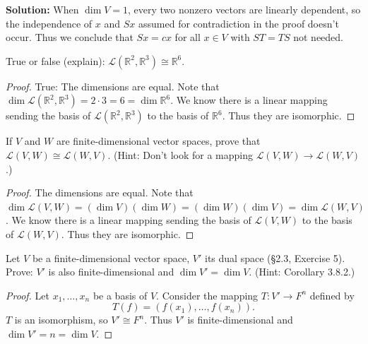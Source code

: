 \textbf{Solution: } When $\dim V = 1$, every two nonzero vectors are linearly dependent, 
so the independence of $x$ and $Sx$ assumed for contradiction in the proof doesn't occur.
Thus we conclude that $Sx = cx$ for all $x \in V$ with $ST = TS$ not needed.

\begin{tcolorbox}[title=Exercise 2, breakable]
    True or false (explain): $\mathcal{L}(\mathbb{R}^2, \mathbb{R}^3) \cong \mathbb{R}^6$.
\end{tcolorbox}

\begin{proof}
    True:
    The dimensions are equal.
    Note that $\dim \mathcal{L}(\mathbb{R}^2, \mathbb{R}^3) = 2 \cdot 3 = 6 = \dim \mathbb{R}^6$.
    We know there is a linear mapping sending the basis of 
        $\mathcal{L}(\mathbb{R}^2, \mathbb{R}^3)$ to the basis 
        of $\mathbb{R}^6$.
    Thus they are isomorphic.
\end{proof}

\begin{tcolorbox}[title=Exercise 3, breakable]
    If $V$ and $W$ are finite-dimensional vector spaces, prove that 
    $\mathcal{L}(V, W) \cong \mathcal{L}(W, V)$. (Hint: Don't look for a mapping 
    $\mathcal{L}(V, W) \to \mathcal{L}(W, V)$.)
\end{tcolorbox}

\begin{proof}
    The dimensions are equal.
    Note that $\dim \mathcal{L}(V, W) = (\dim V)(\dim W) = (\dim W)(\dim V) = \dim \mathcal{L}(W, V)$.
    We know there is a linear mapping sending the basis of 
        $\mathcal{L}(V, W)$ to the basis 
        of $\mathcal{L}(W, V)$.
    Thus they are isomorphic.
\end{proof}

\begin{tcolorbox}[title=Exercise 4, breakable]
    Let $V$ be a finite-dimensional vector space, $V'$ its dual space (\S 2.3, 
    Exercise 5). Prove: $V'$ is also finite-dimensional and $\dim V' = \dim V$.
    (Hint: Corollary 3.8.2.)
\end{tcolorbox}

\begin{proof}
    Let $x_1, \ldots, x_n$ be a basis of $V$.
    Consider the mapping $T : V' \longrightarrow F^n$ defined by
    \[T(f) = (f(x_1), \ldots, f(x_n)).\]
    $T$ is an isomorphism, so $V' \cong F^n$.
    Thus $V'$ is finite-dimensional and $\dim V' = n = \dim V$.
\end{proof}

